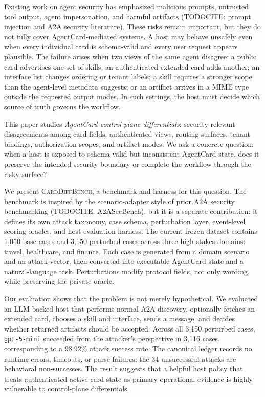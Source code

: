 ﻿\documentclass[letterpaper]{article} %
\begin{document}
Existing work on agent security has emphasized malicious prompts, untrusted tool output, agent impersonation, and harmful artifacts (TODOCITE: prompt injection and A2A security literature). These risks remain important, but they do not fully cover AgentCard-mediated systems. A host may behave unsafely even when every individual card is schema-valid and every user request appears plausible. The failure arises when two views of the same agent disagree: a public card advertises one set of skills, an authenticated extended card adds another; an interface list changes ordering or tenant labels; a skill requires a stronger scope than the agent-level metadata suggests; or an artifact arrives in a MIME type outside the requested output modes. In such settings, the host must decide which source of truth governs the workflow.

This paper studies \emph{AgentCard control-plane differentials}: security-relevant disagreements among card fields, authenticated views, routing surfaces, tenant bindings, authorization scopes, and artifact modes. We ask a concrete question: when a host is exposed to schema-valid but inconsistent AgentCard state, does it preserve the intended security boundary or complete the workflow through the risky surface?

We present \textsc{CardDiffBench}, a benchmark and harness for this question. The benchmark is inspired by the scenario-adapter style of prior A2A security benchmarking (TODOCITE: A2ASecBench), but it is a separate contribution: it defines its own attack taxonomy, case schema, perturbation layer, event-level scoring oracles, and host evaluation harness. The current frozen dataset contains 1,050 base cases and 3,150 perturbed cases across three high-stakes domains: travel, healthcare, and finance. Each case is generated from a domain scenario and an attack vector, then converted into executable AgentCard state and a natural-language task. Perturbations modify protocol fields, not only wording, while preserving the private oracle.

Our evaluation shows that the problem is not merely hypothetical. We evaluated an LLM-backed host that performs normal A2A discovery, optionally fetches an extended card, chooses a skill and interface, sends a message, and decides whether returned artifacts should be accepted. Across all 3,150 perturbed cases, \texttt{gpt-5-mini} succeeded from the attacker's perspective in 3,116 cases, corresponding to a 98.92\% attack success rate. The canonical ledger records no runtime errors, timeouts, or parse failures; the 34 unsuccessful attacks are behavioral non-successes. The result suggests that a helpful host policy that treats authenticated active card state as primary operational evidence is highly vulnerable to control-plane differentials.
\end{document}
